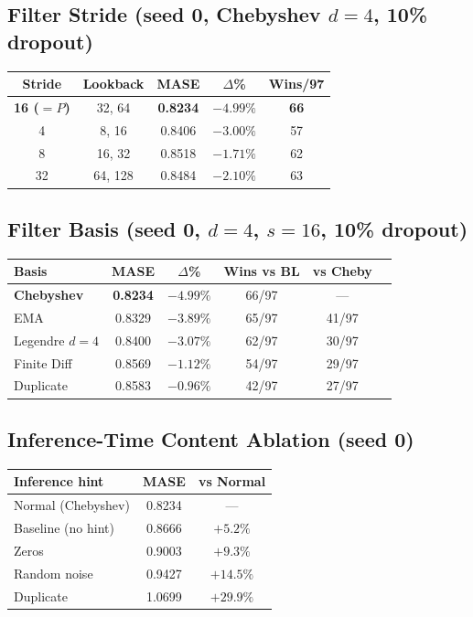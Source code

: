 \documentclass[letterpaper]{article}
\begin{document}
\subsection{Filter Stride (seed 0, Chebyshev $d=4$, 10\% dropout)}

\begin{table}[h]
\centering
\small
\begin{tabular}{ccccc}
\toprule
\textbf{Stride} & \textbf{Lookback} & \textbf{MASE} & \textbf{$\Delta$\%} & \textbf{Wins/97} \\
\midrule
\textbf{16 ($=P$)} & 32, 64 & \textbf{0.8234} & $-4.99\%$ & \textbf{66} \\
4 & 8, 16 & 0.8406 & $-3.00\%$ & 57 \\
8 & 16, 32 & 0.8518 & $-1.71\%$ & 62 \\
32 & 64, 128 & 0.8484 & $-2.10\%$ & 63 \\
\bottomrule
\end{tabular}
\end{table}

\subsection{Filter Basis (seed 0, $d=4$, $s=16$, 10\% dropout)}

\begin{table}[h]
\centering
\small
\begin{tabular}{lccccc}
\toprule
\textbf{Basis} & \textbf{MASE} & \textbf{$\Delta$\%} & \textbf{Wins vs BL} & \textbf{vs Cheby} \\
\midrule
\textbf{Chebyshev} & \textbf{0.8234} & $-4.99\%$ & 66/97 & --- \\
EMA & 0.8329 & $-3.89\%$ & 65/97 & 41/97 \\
Legendre $d=4$ & 0.8400 & $-3.07\%$ & 62/97 & 30/97 \\
Finite Diff & 0.8569 & $-1.12\%$ & 54/97 & 29/97 \\
Duplicate & 0.8583 & $-0.96\%$ & 42/97 & 27/97 \\
\bottomrule
\end{tabular}
\end{table}

\subsection{Inference-Time Content Ablation (seed 0)}

\begin{table}[h]
\centering
\small
\begin{tabular}{lcc}
\toprule
\textbf{Inference hint} & \textbf{MASE} & \textbf{vs Normal} \\
\midrule
Normal (Chebyshev) & 0.8234 & --- \\
Baseline (no hint) & 0.8666 & $+5.2\%$ \\
Zeros & 0.9003 & $+9.3\%$ \\
Random noise & 0.9427 & $+14.5\%$ \\
Duplicate & 1.0699 & $+29.9\%$ \\
\bottomrule
\end{tabular}
\end{table}
\end{document}
